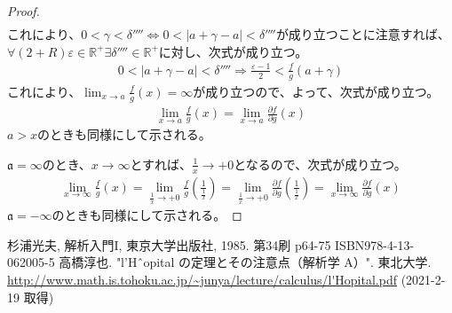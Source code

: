 \documentclass[dvipdfmx]{jsarticle}
\begin{document}
\begin{proof}
\begin{align*}
\end{align*}
これにより、$0 < \gamma < \delta'''' \Leftrightarrow 0 < \left| a + \gamma - a \right| < \delta''''$が成り立つことに注意すれば、$\forall(2 + R)\varepsilon \in \mathbb{R}^{+}\exists\delta'''' \in \mathbb{R}^{+}$に対し、次式が成り立つ。
\begin{align*}
0 < \left| a + \gamma - a \right| < \delta'''' \Rightarrow \frac{\varepsilon - 1}{2} < \frac{f}{g}\left( a + \gamma \right)
\end{align*}
これにより、$\lim_{x \rightarrow a}{\frac{f}{g}(x)} = \infty$が成り立つので、よって、次式が成り立つ。
\begin{align*}
\lim_{x \rightarrow a}{\frac{f}{g}(x)} = \lim_{x \rightarrow a}{\frac{\partial f}{\partial g}(x)}
\end{align*}
$a > x$のときも同様にして示される。\par
$\mathfrak{a = \infty}$のとき、$x \rightarrow \infty$とすれば、$\frac{1}{x} \rightarrow + 0$となるので、次式が成り立つ。
\begin{align*}
\lim_{x \rightarrow \infty}{\frac{f}{g}(x)} = \lim_{\frac{1}{x} \rightarrow + 0}{\frac{f}{g}\left( \frac{1}{\frac{1}{x}} \right)} = \lim_{\frac{1}{x} \rightarrow + 0}{\frac{\partial f}{\partial g}\left( \frac{1}{\frac{1}{x}} \right)} = \lim_{x \rightarrow \infty}{\frac{\partial f}{\partial g}(x)}
\end{align*}
$\mathfrak{a = - \infty}$のときも同様にして示される。
\end{proof}
\begin{thebibliography}{50}
  杉浦光夫, 解析入門I, 東京大学出版社, 1985. 第34刷 p64-75 ISBN978-4-13-062005-5
  高橋淳也. "l'Hˆopital の定理とその注意点（解析学 A）". 東北大学. \url{http://www.math.is.tohoku.ac.jp/~junya/lecture/calculus/l'Hopital.pdf} (2021-2-19 取得)
\end{thebibliography}
\end{document}

